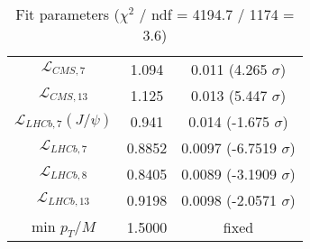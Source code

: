\begin{table}[h!]
\begin{tabular}{c|c|c}
$\mathcal L_{CMS,7}$ & 1.094 & 0.011 (4.265 $\sigma$) \\
$\mathcal L_{CMS,13}$ & 1.125 & 0.013 (5.447 $\sigma$) \\
$\mathcal L_{LHCb,7}(J/\psi)$ & 0.941 & 0.014 (-1.675 $\sigma$) \\
$\mathcal L_{LHCb,7}$ & 0.8852 & 0.0097 (-6.7519 $\sigma$) \\
$\mathcal L_{LHCb,8}$ & 0.8405 & 0.0089 (-3.1909 $\sigma$) \\
$\mathcal L_{LHCb,13}$ & 0.9198 & 0.0098 (-2.0571 $\sigma$) \\
min $p_T/M$ & 1.5000 & fixed \\
\end{tabular}
\caption{Fit parameters ($\chi^2$ / ndf = 4194.7 / 1174 = 3.6)}
\end{table}
